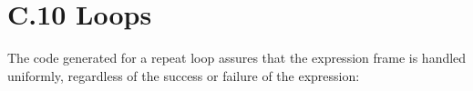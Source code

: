 \begin{center}
\tabletail{}
\tablelasttail{}
\begin{supertabular}{|m{1.9073598in}|m{2.75596in}|}

\end{supertabular}
\end{center}


\section[C.10 Loops]{C.10 Loops}

The code generated for a repeat loop assures that the expression frame
is handled uniformly, regardless of the success or failure of the
expression:

\begin{center}
\tabletail{}
\tablelasttail{}
\begin{supertabular}{|m{1.9073598in}|m{2.75596in}|}

\end{supertabular}
\end{center}

